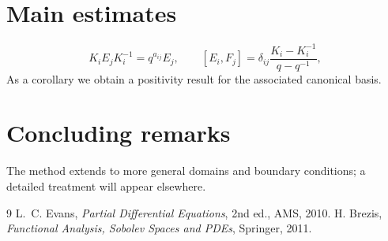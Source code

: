 \section{Main estimates}
\begin{equation}
K_i E_j K_i^{-1}=q^{a_{ij}}E_j,\qquad [E_i,F_j]=\delta_{ij}\frac{K_i-K_i^{-1}}{q-q^{-1}},
\end{equation}
As a corollary we obtain a positivity result for the associated canonical basis.

\section{Concluding remarks}
The method extends to more general domains and boundary conditions; a detailed
treatment will appear elsewhere.

\begin{thebibliography}{9}
 L.~C. Evans, \emph{Partial Differential Equations}, 2nd ed., AMS, 2010.
 H. Brezis, \emph{Functional Analysis, Sobolev Spaces and PDEs}, Springer, 2011.
\end{thebibliography}

